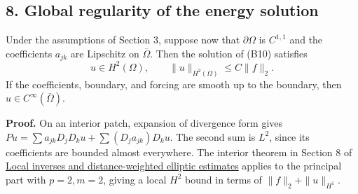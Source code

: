\documentclass[
  11pt,
]{article}
\makeatletter
\let\ReaderOriginalAnchorStart\hyper@anchorstart
\let\ReaderOriginalAnchorEnd\hyper@anchorend
\let\ReaderPendingAliases\@empty
\def\ReaderArmAliases#1{\gdef\ReaderPendingAliases{#1}}
\def\hyper@anchorstart#1{\ReaderIfNativeAnchorTF{#1}{\ReaderPendingAliases\global\let\ReaderPendingAliases\@empty}{}\ReaderOriginalAnchorStart{#1}}
\makeatother
\begin{document}
\ReaderArmAliases{\ReaderOriginalAnchorStart{AN03-SBD-008}\ReaderOriginalAnchorEnd\begingroup\expandafter\def\csname @currentHref\endcsname{AN03-SBD-008}\label{AN03-SBD-008}\endgroup\ReaderOriginalAnchorStart{an03-sbd-008-global-regularity-of-the-energy-solution}\ReaderOriginalAnchorEnd\begingroup\expandafter\def\csname @currentHref\endcsname{an03-sbd-008-global-regularity-of-the-energy-solution}\label{an03-sbd-008-global-regularity-of-the-energy-solution}\endgroup\ReaderOriginalAnchorStart{8-global-regularity-of-the-energy-solution}\ReaderOriginalAnchorEnd\begingroup\expandafter\def\csname @currentHref\endcsname{8-global-regularity-of-the-energy-solution}\label{8-global-regularity-of-the-energy-solution}\endgroup\ReaderOriginalAnchorStart{global-regularity-of-the-energy-solution}\ReaderOriginalAnchorEnd}
\subsection{8. Global regularity of the energy
solution}\label{global-regularity-of-the-energy-solution}

Under the assumptions of Section 3, suppose now that \(\partial\Omega\)
is \(C^{1,1}\) and the coefficients \(a_{jk}\) are Lipschitz on
\(\overline\Omega\). Then the solution of (B10) satisfies \[
 u\in H^2(\Omega),\qquad \|u\|_{H^2(\Omega)}\leq C\|f\|_2. \tag{B29}
\] If the coefficients, boundary, and forcing are smooth up to the
boundary, then \(u\in C^\infty(\overline\Omega)\).

\textbf{Proof.} On an interior patch, expansion of divergence form gives
\(Pu=\sum a_{jk}D_jD_ku+\sum(D_ja_{jk})D_ku\). The second sum is
\(L^2\), since its coefficients are bounded almost everywhere. The
interior theorem in Section 8 of
\href{local-elliptic-coefficients.pdf}{Local inverses and
distance-weighted elliptic estimates} applies to the principal part with
\(p=2,m=2\), giving a local \(H^2\) bound in terms of
\(\|f\|_2+\|u\|_{H^1}\).
\end{document}
